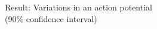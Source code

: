 \documentclass[presentation]{beamer}
\begin{document}

\begin{frame}{Result: Variations in an action potential \\(90\% confidence interval)}
   \vspace{-5mm}
\begin{figure}
\end{figure}
\end{frame}
\end{document}
